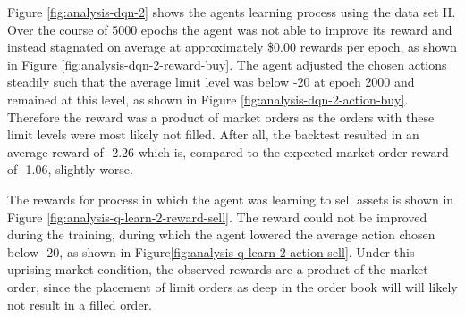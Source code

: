 Figure \ref{fig:analysis-dqn-2} shows the agents learning process using the data set II.
Over the course of 5000 epochs the agent was not able to improve its reward and instead stagnated on average at approximately \$0.00 rewards per epoch, as shown in Figure \ref{fig:analysis-dqn-2-reward-buy}.
The agent adjusted the chosen actions steadily such that the average limit level was below -20 at epoch 2000 and remained at this level, as shown in Figure \ref{fig:analysis-dqn-2-action-buy}.
Therefore the reward was a product of market orders as the orders with these limit levels were most likely not filled.
After all, the backtest resulted in an average reward of -2.26 which is, compared to the expected market order reward of -1.06, slightly worse.

The rewards for process in which the agent was learning to sell assets is shown in Figure \ref{fig:analysis-q-learn-2-reward-sell}.
The reward could not be improved during the training, during which the agent lowered the average action chosen below -20, as shown in Figure\ref{fig:analysis-q-learn-2-action-sell}.
Under this uprising market condition, the observed rewards are a product of the market order, since the placement of limit orders as deep in the order book will will likely not result in a filled order.

